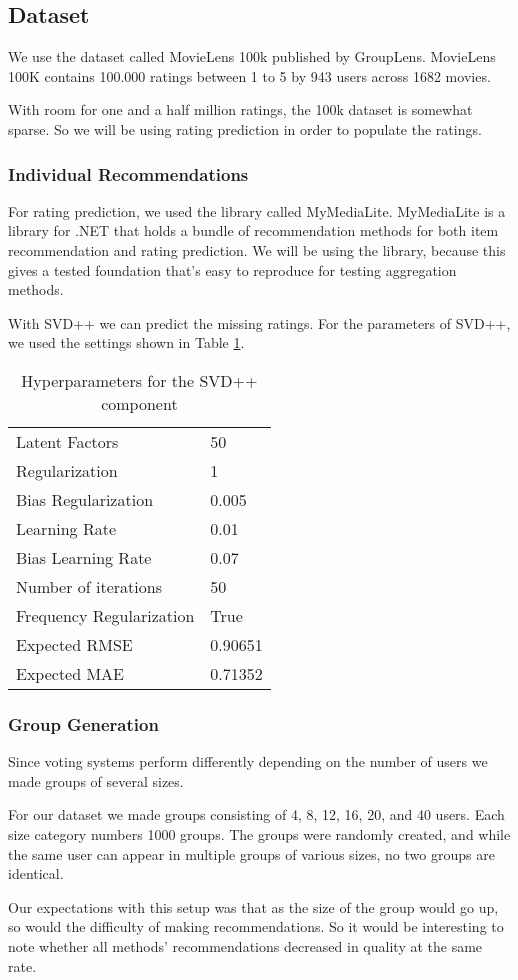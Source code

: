 \subsection{Dataset}\label{sec:dataset}
We use the dataset called MovieLens 100k published by GroupLens\cite{movielens100k}. MovieLens 100K contains 100.000 ratings between 1 to 5 by 943 users across 1682 movies.

With room for one and a half million ratings, the 100k dataset is somewhat sparse. So we will be using rating prediction in order to populate the ratings.

\subsubsection{Individual Recommendations}
For rating prediction, we used the library called MyMediaLite\cite{mymedialite}. MyMediaLite is a library for .NET that holds a bundle of recommendation methods for both item recommendation and rating prediction. We will be using the library, because this gives a tested foundation that's easy to reproduce for testing aggregation methods.

With SVD++ we can predict the missing ratings. For the parameters of SVD++, we used the settings shown in Table \ref{tbl:svdpp}.

\begin{table}[H]
	\centering
	\begin{tabular}{|l|l|}\hline
		Latent Factors & 50 \\
		Regularization & 1	\\
		Bias Regularization & 0.005	\\
		Learning Rate & 0.01 \\
		Bias Learning Rate & 0.07 \\ 
		Number of iterations & 50 \\
		Frequency Regularization & True \\ 
		Expected RMSE & 0.90651 \\
		Expected MAE & 0.71352 \\ \hline
	\end{tabular}
	\caption{Hyperparameters for the SVD++ component}
	\label{tbl:svdpp}
\end{table}

\subsubsection{Group Generation}\label{sec:groupgeneration}
Since voting systems perform differently depending on the number of users we made groups of several sizes.

For our dataset we made groups consisting of 4, 8, 12, 16, 20, and 40 users. Each size category numbers 1000 groups. The groups were randomly created, and while the same user can appear in multiple groups of various sizes, no two groups are identical.

Our expectations with this setup was that as the size of the group would go up, so would the difficulty of making recommendations. So it would be interesting to note whether all methods' recommendations decreased in quality at the same rate.